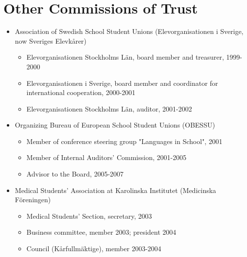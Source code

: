 \documentclass[10pt,a4paper,twocolumn]{article}
\begin{document}
\section{Other Commissions of Trust}
\begin{itemize}

    \item Association of Swedish School Student Unions (Elevorganisationen i Sverige, now Sveriges Elevkårer)

    \begin{itemize}

        \item Elevorganisationen Stockholms Län, board member and treasurer, 1999-2000

        \item Elevorganisationen i Sverige, board member and coordinator for international cooperation, 2000-2001

        \item Elevorganisationen Stockholms Län, auditor, 2001-2002

    \end{itemize}


    \item Organizing Bureau of European School Student Unions (OBESSU)

    \begin{itemize}

        \item Member of conference steering group "Languages in School", 2001

        \item Member of Internal Auditors' Commission, 2001-2005

        \item Advisor to the Board, 2005-2007

    \end{itemize}


    \item Medical Students' Association at Karolinska Institutet (Medicinska Föreningen)

    \begin{itemize}

        \item Medical Students' Section, secretary, 2003

        \item Business committee, member 2003; president 2004

        \item Council (Kårfullmäktige), member 2003-2004


\end{itemize}
\end{itemize}
\end{document}
